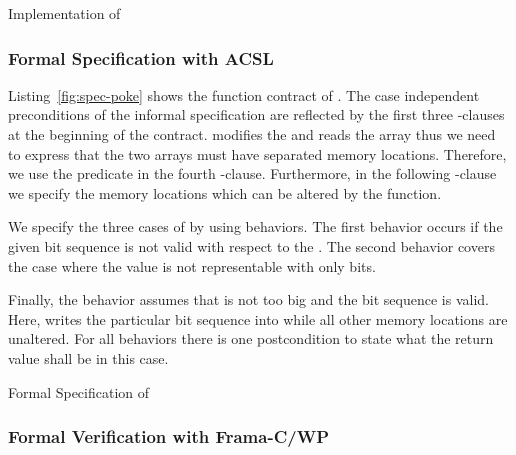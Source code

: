 \begin{listing}[hbt]
\begin{minipage}{\textwidth}

\end{minipage}
\caption{\label{fig:impl-poke} Implementation of \poke}
\end{listing}



\clearpage
\subsubsection{Formal Specification with ACSL}
\label{formal-poke}

Listing~\ref{fig:spec-poke} shows the function contract of \poke.
The case independent preconditions of the informal specification 
are reflected by the  first three -clauses at the beginning of the contract.
\poke modifies the  and reads the array
 thus we need to express 
that the two arrays must have separated memory locations. 
Therefore, we use the predicate  in the fourth -clause.
Furthermore, in the following -clause we specify the memory locations which 
can be altered by the function.

We specify the three cases of \poke by using behaviors. 
The first behavior  occurs if the given bit sequence is not valid with respect to the . 
The second behavior  covers the case where the value  
is not representable with only  bits.

Finally, the behavior  assumes 
that  is not too big and the bit sequence is valid. 
Here, \poke writes the particular bit sequence into  
while all other memory locations are unaltered.
For all behaviors there is one postcondition to state what
the return value shall be in this case.


\begin{listing}[hbt]
\begin{minipage}{\textwidth}

\end{minipage}
\caption{\label{fig:spec-poke} Formal Specification of \poke}
\end{listing}



\FloatBarrier

\subsubsection{Formal Verification with Frama-C/WP}
\label{verification-poke}

